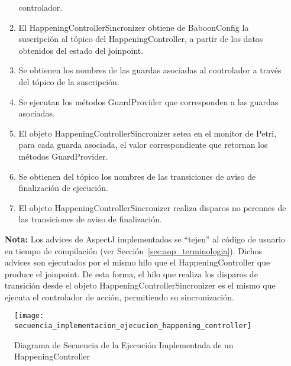 \begin{itemize}
\begin{enumerate}
  	  controlador.
  	  \item El HappeningControllerSincronizer obtiene de BaboonConfig la
  	  suscripción al tópico del HappeningController, a partir de los datos
  	  obtenidos del estado del joinpoint.
  	  \item Se obtienen los nombres de las guardas asociadas al controlador a
  	  través del tópico de la suscripción.
  	  \item Se ejecutan los métodos GuardProvider que corresponden a las guardas
  	  asociadas.
  	  \item El objeto HappeningControllerSincronizer setea en el monitor de
  	  Petri, para cada guarda asociada, el valor correspondiente que retornan los métodos GuardProvider.
  	  \item Se obtienen del tópico los nombres de las transiciones de aviso de
  	  finalización de ejecución.
  	  \item El objeto HappeningControllerSincronizer realiza disparos no perennes
  	  de las transiciones de aviso de finalización.
  	\end{enumerate}
  	
  	\begin{framed}
	\textbf{Nota:} Los advices de AspectJ implementados se ``tejen'' al código de
	usuario en tiempo de compilación (ver Sección~\ref{sec:aop_terminologia}).
	Dichos advices son ejecutados por el mismo hilo que el HappeningController que
	produce el joinpoint. De esta forma, el hilo que realiza los disparos de
	transición desde el objeto HappeningControllerSincronizer es el mismo que
	ejecuta el controlador de acción, permitiendo su sincronización.
	\end{framed}

\end{itemize}

\begin{figure}[H]
	\hspace{-2,90cm}
	\texttt{[image: secuencia\_implementacion\_ejecucion\_happening\_controller]}
	\caption{Diagrama de Secuencia de la Ejecución Implementada de un
	HappeningController}
	\label{fig:diagrama_secuencia_implementacion_ejecucion_happening_controller}
\end{figure}